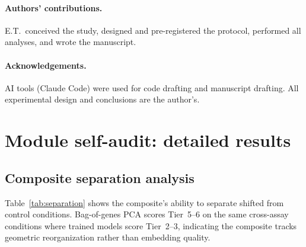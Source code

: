 \documentclass[11pt]{article}
\begin{document}
\paragraph{Authors' contributions.} E.T.\ conceived the study, designed and pre-registered the protocol, performed all analyses, and wrote the manuscript.

\paragraph{Acknowledgements.} AI tools (Claude Code) were used for code drafting and manuscript drafting. All experimental design and conclusions are the author's.


\appendix

\section{Module self-audit: detailed results}
\label{app:modules}

\subsection{Composite separation analysis}

Table~\ref{tab:separation} shows the composite's ability to separate shifted from control conditions. Bag-of-genes PCA scores Tier~5--6 on the same cross-assay conditions where trained models score Tier~2--3, indicating the composite tracks geometric reorganization rather than embedding quality.
\end{document}
